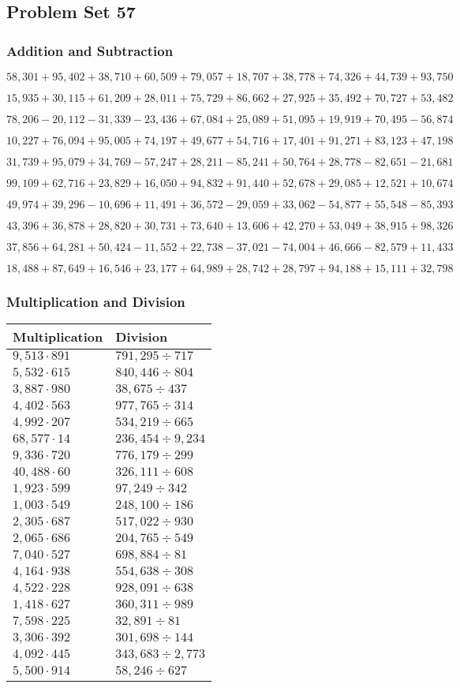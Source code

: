 \hypertarget{problem-set-57-3}{%
\subsection{Problem Set 57}\label{problem-set-57-3}}

\hypertarget{addition-and-subtraction-279}{%
\subsubsection{Addition and
Subtraction}\label{addition-and-subtraction-279}}

\(58,301+95,402+38,710+60,509+79,057+18,707+38,778+74,326+44,739+ 93,750\)

\(15,935+30,115+61,209+28,011+75,729+86,662+27,925+35,492+70,727+53,482\)

\(78,206-20,112-31,339-23,436+67,084+25,089+51,095+19,919+70,495-56,874\)

\(10,227+76,094+95,005+74,197+49,677+54,716+17,401+91,271+83,123+47,198\)

\(31,739+95,079+34,769-57,247+28,211-85,241+50,764+28,778-82,651-21,681\)

\(99,109+62,716+23,829+16,050+94,832+91,440+52,678+29,085+12,521+10,674\)

\(49,974+39,296-10,696+11,491+36,572-29,059+33,062-54,877+55,548-85,393\)

\(43,396+36,878+28,820+30,731+73,640+13,606+42,270+53,049+38,915+98,326\)

\(37,856+64,281+50,424-11,552+22,738-37,021-74,004+46,666-82,579+11,433\)

\(18,488+87,649+16,546+23,177+64,989+28,742+28,797+94,188+15,111+32,798\)

\hypertarget{multiplication-and-division-278}{%
\subsubsection{Multiplication and
Division}\label{multiplication-and-division-278}}

\begin{longtable}[]{@{}ll@{}}
\toprule
Multiplication & Division\tabularnewline
\midrule
\endhead
\(9,513\cdot891\) & \(791,295÷717\)\tabularnewline
\(5,532\cdot615\) & \(840,446÷804\)\tabularnewline
\(3,887\cdot980\) & \(38,675÷437\)\tabularnewline
\(4,402\cdot563\) & \(977,765÷314\)\tabularnewline
\(4,992\cdot207\) & \(534,219÷665\)\tabularnewline
\(68,577\cdot14\) & \(236,454÷9,234\)\tabularnewline
\(9,336\cdot720\) & \(776,179÷299\)\tabularnewline
\(40,488\cdot60\) & \(326,111÷608\)\tabularnewline
\(1,923\cdot599\) & \(97,249÷342\)\tabularnewline
\(1,003\cdot549\) & \(248,100÷186\)\tabularnewline
\(2,305\cdot687\) & \(517,022÷930\)\tabularnewline
\(2,065\cdot686\) & \(204,765÷549\)\tabularnewline
\(7,040\cdot527\) & \(698,884÷81\)\tabularnewline
\(4,164\cdot938\) & \(554,638÷308\)\tabularnewline
\(4,522\cdot228\) & \(928,091÷638\)\tabularnewline
\(1,418\cdot627\) & \(360,311÷989\)\tabularnewline
\(7,598\cdot225\) & \(32,891÷81\)\tabularnewline
\(3,306\cdot392\) & \(301,698÷144\)\tabularnewline
\(4,092\cdot445\) & \(343,683÷2,773\)\tabularnewline
\(5,500\cdot914\) & \(58,246÷627\)\tabularnewline
\bottomrule
\end{longtable}

